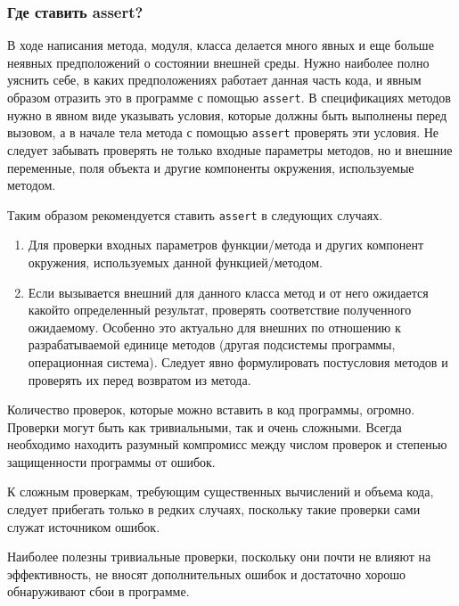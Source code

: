 \newpage
\subsubsection{Где ставить assert?}

В ходе написания метода, модуля, класса делается много явных и еще больше неявных предположений о состоянии внешней среды. Нужно наиболее полно уяснить себе, в каких предположениях работает данная часть кода, и явным образом отразить это в программе с помощью \lstinline|assert|. В спецификациях методов нужно в явном виде указывать условия, которые должны быть выполнены перед вызовом, а в начале тела метода с помощью \lstinline|assert| проверять эти условия. Не следует забывать проверять не только входные параметры методов, но и внешние переменные, поля объекта и другие компоненты окружения, используемые методом. 


Таким образом рекомендуется ставить \lstinline|assert| в следующих случаях.

\begin{enumerate}
\item Для проверки входных параметров функции/метода и других компонент окружения, используемых данной функцией/методом.

\item Если вызывается внешний для данного класса метод и от него ожидается какой\sdash то определенный результат, проверять соответствие полученного ожидаемому. Особенно это актуально для внешних по отношению к разрабатываемой единице методов (другая подсистемы программы, операционная система). Следует явно формулировать постусловия методов и проверять их перед возвратом из метода.
\end{enumerate}

Количество проверок, которые можно вставить в код программы, огромно. Проверки могут быть как тривиальными, так и очень сложными. Всегда необходимо находить разумный компромисс между числом проверок и степенью защищенности программы от ошибок.

К сложным проверкам, требующим существенных вычислений и объема кода, следует прибегать только в редких случаях, поскольку такие проверки сами служат источником ошибок.

Наиболее полезны тривиальные проверки, поскольку они почти не влияют на эффективность, не вносят дополнительных ошибок и достаточно хорошо обнаруживают сбои в программе.

